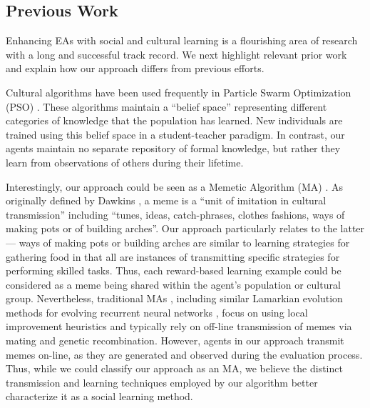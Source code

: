 \documentclass{acm_proc_article-sp}
\begin{document}
\subsection*{Previous Work}

Enhancing EAs with social and cultural learning is a flourishing area of research with a long and successful track record. We next highlight relevant prior work and explain how our approach differs from previous efforts.

Cultural algorithms \cite{reynolds1994introduction} have been used frequently in Particle Swarm Optimization (PSO) \cite{kennedy1995particle}. These algorithms maintain a ``belief space'' representing different categories of knowledge that the population has learned. New individuals are trained using this belief space in a student-teacher paradigm. In contrast, our agents maintain no separate repository of formal knowledge, but rather they learn from observations of others during their lifetime.

Interestingly, our approach could be seen as a Memetic Algorithm (MA) \cite{moscato1989evolution}. As originally defined by Dawkins \cite{dawkins2006selfish}, a meme is a ``unit of imitation in cultural transmission'' including ``tunes, ideas, catch-phrases, clothes fashions, ways of making pots or of building arches''. Our approach particularly relates to the latter--- ways of making pots or building arches are similar to learning strategies for gathering food in that all are instances of transmitting specific strategies for performing skilled tasks. Thus, each reward-based learning example could be considered as a meme being shared within the agent's population or cultural group. Nevertheless, traditional MAs \cite{onwubolu2004new}, including similar Lamarkian evolution methods for evolving recurrent neural networks \cite{ku2000study}, focus on using local improvement heuristics and typically rely on off-line transmission of memes via mating and genetic recombination. However, agents in our approach transmit memes on-line, as they are generated and observed during the evaluation process. Thus, while we could classify our approach as an MA, we believe the distinct transmission and learning techniques employed by our algorithm better characterize it as a social learning method.
\end{document}
